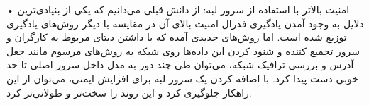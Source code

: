 • امنیت بالاتر با استفاده از سرور لبه: از دانش قبلی می‌دانیم که یکی از بنیادی‌ترین دلایل به وجود آمدن یادگیری فدرال امنیت بالای آن در مقایسه با دیگر روش‌های یادگیری توزیع شده است. اما روش‌های جدیدی آمده که با داشتن دیتای مربوط به کارگران و سرور تجمیع کننده و شنود کردن این داده‌ها روی شبکه به روش‌های مرسوم مانند جعل آدرس و بررسی ترافیک شبکه، می‌توان طی چند دور به مدل داخل سرور اصلی تا حد خوبی دست پیدا کرد\cite{n2}. با اضافه کردن یک سرور لبه برای افزایش ایمنی، می‌توان از این راهکار جلوگیری کرد و این روند را سخت‌تر و طولانی‌تر کرد.
